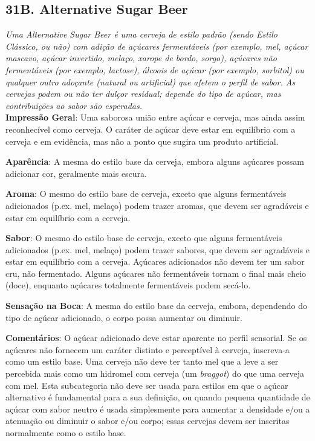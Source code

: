 \subsection*{31B. Alternative Sugar Beer}
\textit{Uma Alternative Sugar Beer é uma cerveja de estilo padrão (sendo Estilo Clássico, ou não) com adição de açúcares fermentáveis (por exemplo, mel, açúcar mascavo, açúcar invertido, melaço, xarope de bordo, sorgo), açúcares não fermentáveis (por exemplo, lactose), álcoois de açúcar (por exemplo, sorbitol) ou qualquer outro adoçante (natural ou artificial) que afetem o perfil de sabor. As cervejas podem ou não ter dulçor residual; depende do tipo de açúcar, mas contribuições ao sabor são esperadas.}\\
\textbf{Impressão Geral}: Uma saborosa união entre açúcar e cerveja, mas ainda assim reconhecível como cerveja. O caráter de açúcar deve estar em equilíbrio com a cerveja e em evidência, mas não a ponto que sugira um produto artificial.

\textbf{Aparência}: A mesma do estilo base da cerveja, embora alguns açúcares possam adicionar cor, geralmente mais escura.

\textbf{Aroma}: O mesmo do estilo base de cerveja, exceto que alguns fermentáveis adicionados (p.ex. mel, melaço) podem trazer aromas, que devem ser agradáveis e estar em equilíbrio com a cerveja.

\textbf{Sabor}: O mesmo do estilo base de cerveja, exceto que alguns fermentáveis adicionados (p.ex. mel, melaço) podem trazer sabores, que devem ser agradáveis e estar em equilíbrio com a cerveja. Açúcares adicionados não devem ter um sabor cru, não fermentado. Alguns açúcares não fermentáveis tornam o final mais cheio (doce), enquanto açúcares totalmente fermentáveis podem secá-lo.

\textbf{Sensação na Boca}: A mesma do estilo base da cerveja, embora, dependendo do tipo de açúcar adicionado, o corpo possa aumentar ou diminuir.

\textbf{Comentários}: O açúcar adicionado deve estar aparente no perfil sensorial. Se os açúcares não fornecem um caráter distinto e perceptível à cerveja, inscreva-a como um estilo base. Uma cerveja não deve ter tanto mel que a leve a ser percebida mais como um hidromel com cerveja (um \textit{braggot}) do que uma cerveja com mel. Esta subcategoria não deve ser usada para estilos em que o açúcar alternativo é fundamental para a sua definição, ou quando pequena quantidade de açúcar com sabor neutro é usada simplesmente para aumentar a densidade e/ou a atenuação ou diminuir o sabor e/ou corpo; essas cervejas devem ser inscritas normalmente como o estilo base.

